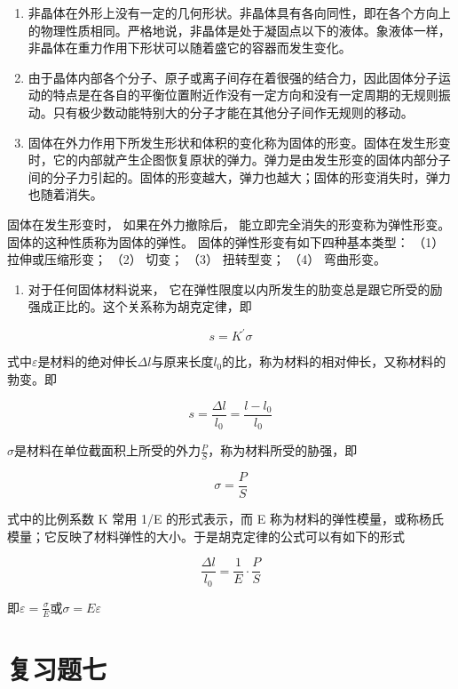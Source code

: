 \begin{enumerate}
\def\labelenumi{\arabic{enumi}.}
\setcounter{enumi}{6}
\item
  非晶体在外形上没有一定的几何形状。非晶体具有各向同性，即在各个方向上的物理性质相同。严格地说，非晶体是处于凝固点以下的液体。象液体一样，非晶体在重力作用下形状可以随着盛它的容器而发生变化。
\item
  由于晶体内部各个分子、原子或离子间存在着很强的结合力，因此固体分子运动的特点是在各自的平衡位置附近作没有一定方向和没有一定周期的无规则振动。只有极少数动能特别大的分子才能在其他分子间作无规则的移动。
\item
  固体在外力作用下所发生形状和体积的变化称为固体的形变。固体在发生形变时，它的内部就产生企图恢复原状的弹力。弹力是由发生形变的固体内部分子间的分子力引起的。固体的形变越大，弹力也越大；固体的形变消失时，弹力也随着消失。
\end{enumerate}

固体在发生形变时， 如果在外力撤除后， 能立即完全消失的形变称为弹性形变。
固体的这种性质称为固体的弹性。 固体的弹性形变有如下四种基本类型： （1）
拉伸或压缩形变； （2） 切变； （3） 扭转型变； （4） 弯曲形变。

\begin{enumerate}
\def\labelenumi{\arabic{enumi}.}
\setcounter{enumi}{9}
\tightlist
\item
  对于任何固体材料说来，
  它在弹性限度以内所发生的肋变总是跟它所受的励强成正比的。这个关系称为胡克定律，即
\end{enumerate}

\[
s = K ^ {\prime} \sigma
\]

式中\(\varepsilon\)是材料的绝对伸长\(\Delta l\)与原来长度\(l_0\)的比，称为材料的相对伸长，又称材料的勃变。即

\[
s = \frac {\Delta l}{l _ {0}} = \frac {l - l _ {0}}{l _ {0}}
\]

\(\sigma\)是材料在单位截面积上所受的外力\(\frac{P}{S}\)，称为材料所受的胁强，即

\[
\sigma = \frac {P}{S}
\]

式中的比例系数 K 常用 1/E 的形式表示，而 E
称为材料的弹性模量，或称杨氏模量；它反映了材料弹性的大小。于是胡克定律的公式可以有如下的形式

\[
\frac {\Delta l}{l _ {0}} = \frac {1}{E} \cdot \frac {P}{S}
\]

即\(\varepsilon = \frac{\sigma}{E}\)或\(\sigma = E\varepsilon\)

\section{复习题七}\label{ux590dux4e60ux9898ux4e03}

